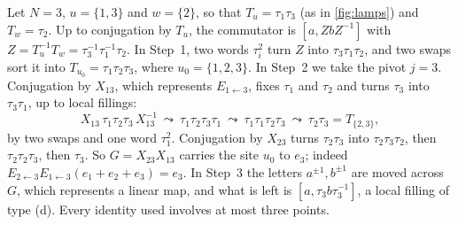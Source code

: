 \begin{example}\label{pair:ex}
Let $N=3$, $u=\{1,3\}$ and $w=\{2\}$, so that $T_u=\tau_1\tau_3$ (as in \cref{fig:lamps}) and $T_w=\tau_2$. Up to conjugation by $T_u$, the
commutator is $[a,ZbZ^{-1}]$ with $Z=T_u^{-1}T_w=\tau_3^{-1}\tau_1^{-1}\tau_2$. In Step~1, two words $\tau_i^2$ turn $Z$ into $\tau_3\tau_1\tau_2$,
and two swaps sort it into $T_{u_0}=\tau_1\tau_2\tau_3$, where $u_0=\{1,2,3\}$. In Step~2 we take the pivot $j=3$. Conjugation by $X_{13}$,
which represents $E_{1\leftarrow3}$, fixes $\tau_1$ and $\tau_2$ and turns $\tau_3$ into $\tau_3\tau_1$, up to local fillings:
\[
X_{13}\,\tau_1\tau_2\tau_3\,X_{13}^{-1}\ \leadsto\ \tau_1\tau_2\tau_3\tau_1\ \leadsto\ \tau_1\tau_1\tau_2\tau_3\ \leadsto\ \tau_2\tau_3=T_{\{2,3\}},
\]
by two swaps and one word $\tau_1^2$. Conjugation by $X_{23}$ turns $\tau_2\tau_3$ into $\tau_2\tau_3\tau_2$, then $\tau_2\tau_2\tau_3$, then
$\tau_3$. So $G=X_{23}X_{13}$ carries the site $u_0$ to $e_3$; indeed $E_{2\leftarrow3}E_{1\leftarrow3}(e_1+e_2+e_3)=e_3$. In Step~3 the
letters $a^{\pm1},b^{\pm1}$ are moved across $G$, which represents a linear map, and what is left is $[a,\tau_3b\tau_3^{-1}]$, a local filling
of type (d). Every identity used involves at most three points.
\end{example}

